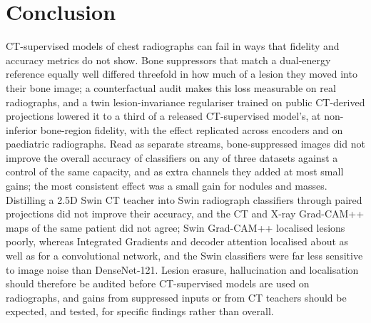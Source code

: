 \section{Conclusion}
\label{sec:conclusion}
CT-supervised models of chest radiographs can fail in ways that fidelity and accuracy metrics do not show. Bone suppressors that match a
dual-energy reference equally well differed threefold in how much of a lesion they moved into their bone image; a counterfactual audit makes
this loss measurable on real radiographs, and a twin lesion-invariance regulariser trained on public CT-derived projections lowered it to a
third of a released CT-supervised model's, at non-inferior bone-region fidelity, with the effect replicated across encoders and on
paediatric radiographs. Read as separate streams, bone-suppressed images did not improve the overall accuracy of classifiers on any of three
datasets against a control of the same capacity, and as extra channels they added at most small gains; the most consistent effect was a
small gain for nodules and masses. Distilling a 2.5D Swin CT teacher into Swin
radiograph classifiers through paired projections did not improve their accuracy, and the CT and X-ray Grad-CAM++ maps of the same patient
did not agree; Swin Grad-CAM++ localised lesions poorly, whereas Integrated Gradients and decoder attention localised about as well as for a
convolutional network, and the Swin classifiers were far less sensitive to image noise than DenseNet-121. Lesion erasure, hallucination and localisation
should therefore be audited before CT-supervised models are used on radiographs, and gains from suppressed inputs or from CT teachers should
be expected, and tested, for specific findings rather than overall.
